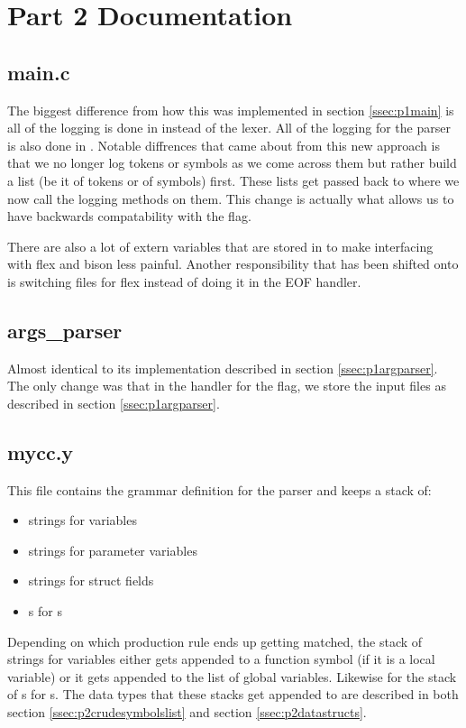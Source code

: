 \documentclass{article}
\begin{document}
\section{Part 2 Documentation}
\subsection{main.c}
\label{ssec:p2main}
The biggest difference from how this was implemented in section \ref{ssec:p1main} is all of the logging is done in  instead of the lexer.
All of the logging for the parser is also done in .
Notable diffrences that came about from this new approach is that we no longer log tokens or symbols as we come across them but rather build a list (be it of tokens or of symbols) first.
These lists get passed back to  where we now call the logging methods on them.
This change is actually what allows us to have backwards compatability with the  flag.

There are also a lot of extern variables that are stored in  to make interfacing with flex and bison less painful.
Another responsibility that has been shifted onto  is switching files for flex instead of doing it in the EOF handler.

\subsection{args\_parser}
\label{ssec:p2argparser}
Almost identical to its implementation described in section \ref{ssec:p1argparser}.
The only change was that in the handler for the  flag, we store the input files as described in section \ref{ssec:p1argparser}.

\subsection{mycc.y}
\label{ssec:p2parser}
This file contains the grammar definition for the parser and keeps a stack of:
\begin{itemize}
     \item strings for variables 
     \item strings for parameter variables
     \item strings for struct fields
     \item {}s for s
\end{itemize}

Depending on which production rule ends up getting matched, the stack of strings for variables either gets appended to a function symbol (if it is a local variable) or it gets appended to the list of global variables.
Likewise for the stack of s for s.
The data types that these stacks get appended to are described in both section \ref{ssec:p2crudesymbolslist} and section \ref{ssec:p2datastructs}.
\end{document}
